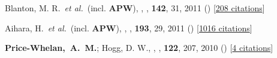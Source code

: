 \item[{\color{deemph}\scriptsize3}]Blanton, M. R.~\textit{et al.}~(incl. \textbf{APW}), , \aj, \textbf{142}, 31, 2011 () [\href{http://adsabs.harvard.edu/abs/2011AJ....142...31B}{208 citations}]

\item[{\color{deemph}\scriptsize2}]Aihara, H.~\textit{et al.}~(incl. \textbf{APW}), , \apjs, \textbf{193}, 29, 2011 () [\href{http://adsabs.harvard.edu/abs/2011ApJS..193...29A}{1016 citations}]

\item[{\color{deemph}\scriptsize1}]\textbf{Price-Whelan,~A.~M.}; Hogg, D. W., , \pasp, \textbf{122}, 207, 2010 () [\href{http://adsabs.harvard.edu/abs/2010PASP..122..207P}{4 citations}]